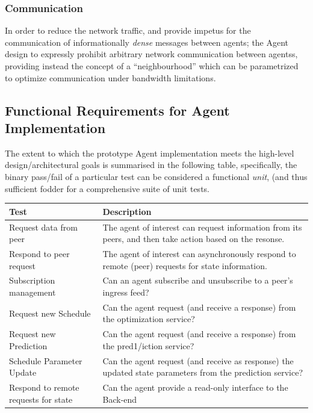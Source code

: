 \documentclass{report}
\begin{document}
\subsubsection{Communication}
In order to reduce the network traffic, and provide impetus for the communication of informationally \emph{dense} messages between agents; the Agent design to expressly prohibit arbitrary network communication between agentss, providing instead the concept of a ``neighbourhood'' which can be parametrized to optimize communication under bandwidth limitations.

\subsection{Functional Requirements for Agent Implementation}

The extent to which the prototype Agent implementation meets the high-level design/architectural goals is summarised in the following table, specifically, the binary pass/fail of a particular test can be considered a functional \emph{unit}, (and thus sufficient fodder for a comprehensive suite of unit tests.

\begin{longtable}[H]{| P{4cm} | P{10cm} |} 
\hline
    Test                                & Description                                                                                               \\ \hline
    [network] Request data from peer    & The agent of interest can request information from its peers, and then take action based on the resonse.  \\ \hline
    [network] Respond to peer request   & The agent of interest can asynchronously respond to remote (peer) requests for state information.         \\ \hline
    [network] Subscription management   & Can an agent subscribe and unsubscribe to a peer's ingress feed?                                          \\ \hline
    [opt] Request new Schedule          & Can the agent request (and receive a response)  from the optimization service?                            \\ \hline
    [predict] Request new Prediction    & Can the agent request (and receive a response) from the pred1/iction service?                               \\ \hline
    [predict] Schedule Parameter Update & Can the agent request (and receive as response) the updated state parameters from the prediction service? \\ \hline
    [data] Respond to remote requests for state & Can the agent provide a read-only interface to the Back-end\\ \hline
\end{longtable}\label{tab:func_req}
\end{document}
